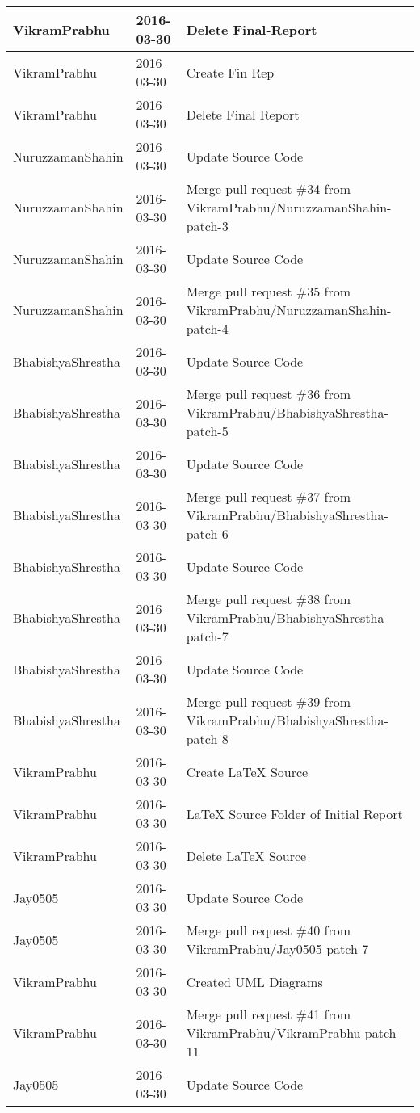 \documentclass[a4paper]{article}
\begin{document}
\begin{center}
\begin{longtable}{|l|l|l|}
VikramPrabhu & 2016-03-30 & Delete Final-Report \\ \hline
VikramPrabhu & 2016-03-30 & Create Fin Rep \\ \hline
VikramPrabhu & 2016-03-30 & Delete Final Report \\ \hline
NuruzzamanShahin & 2016-03-30 & Update Source Code \\ \hline
NuruzzamanShahin & 2016-03-30 & Merge pull request \#34 from VikramPrabhu/NuruzzamanShahin-patch-3 \\ \hline
NuruzzamanShahin & 2016-03-30 & Update Source Code \\ \hline
NuruzzamanShahin & 2016-03-30 & Merge pull request \#35 from VikramPrabhu/NuruzzamanShahin-patch-4 \\ \hline
BhabishyaShrestha & 2016-03-30 & Update Source Code \\ \hline
BhabishyaShrestha & 2016-03-30 & Merge pull request \#36 from VikramPrabhu/BhabishyaShrestha-patch-5 \\ \hline
BhabishyaShrestha & 2016-03-30 & Update Source Code \\ \hline
BhabishyaShrestha & 2016-03-30 & Merge pull request \#37 from VikramPrabhu/BhabishyaShrestha-patch-6 \\ \hline
BhabishyaShrestha & 2016-03-30 & Update Source Code \\ \hline
BhabishyaShrestha & 2016-03-30 & Merge pull request \#38 from VikramPrabhu/BhabishyaShrestha-patch-7 \\ \hline
BhabishyaShrestha & 2016-03-30 & Update Source Code \\ \hline
BhabishyaShrestha & 2016-03-30 & Merge pull request \#39 from VikramPrabhu/BhabishyaShrestha-patch-8 \\ \hline
VikramPrabhu & 2016-03-30 & Create LaTeX Source \\ \hline
VikramPrabhu & 2016-03-30 & LaTeX Source Folder of Initial Report \\ \hline
VikramPrabhu & 2016-03-30 & Delete LaTeX Source \\ \hline
Jay0505 & 2016-03-30 & Update Source Code \\ \hline
Jay0505 & 2016-03-30 & Merge pull request \#40 from VikramPrabhu/Jay0505-patch-7 \\ \hline
VikramPrabhu & 2016-03-30 & Created UML Diagrams \\ \hline
VikramPrabhu & 2016-03-30 & Merge pull request \#41 from VikramPrabhu/VikramPrabhu-patch-11 \\ \hline
Jay0505 & 2016-03-30 & Update Source Code \\ \hline

\end{longtable}
\end{center}
\end{document}
